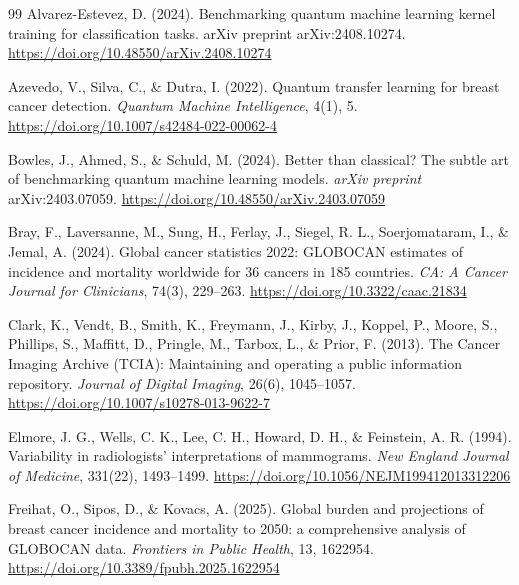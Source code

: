\begin{thebibliography}{99}
    Alvarez-Estevez, D. (2024). Benchmarking quantum machine learning kernel training
    for classification tasks. arXiv preprint arXiv:2408.10274.
    \url{https://doi.org/10.48550/arXiv.2408.10274}


    Azevedo, V., Silva, C., \& Dutra, I. (2022). Quantum transfer learning for breast
    cancer detection. \textit{Quantum Machine Intelligence}, 4(1), 5.
    \url{https://doi.org/10.1007/s42484-022-00062-4}


    Bowles, J., Ahmed, S., \& Schuld, M. (2024).
    Better than classical? The subtle art of benchmarking quantum machine learning models.
    \textit{arXiv preprint} arXiv:2403.07059.
    \url{https://doi.org/10.48550/arXiv.2403.07059}

    Bray, F., Laversanne, M., Sung, H., Ferlay, J., Siegel, R. L., Soerjomataram, I., \& Jemal, A. (2024).
    Global cancer statistics 2022: GLOBOCAN estimates of incidence and mortality worldwide for 36 cancers in 185 countries.
    \textit{CA: A Cancer Journal for Clinicians}, 74(3), 229--263.
    \url{https://doi.org/10.3322/caac.21834}

    Clark, K., Vendt, B., Smith, K., Freymann, J., Kirby, J., Koppel, P., Moore, S., Phillips, S., Maffitt, D., Pringle, M., Tarbox, L., \& Prior, F. (2013).
    The Cancer Imaging Archive (TCIA): Maintaining and operating a public information repository.
    \textit{Journal of Digital Imaging}, 26(6), 1045--1057.
    \url{https://doi.org/10.1007/s10278-013-9622-7}

    Elmore, J. G., Wells, C. K., Lee, C. H., Howard, D. H., \& Feinstein, A. R. (1994).
    Variability in radiologists' interpretations of mammograms.
    \textit{New England Journal of Medicine}, 331(22), 1493--1499.
    \url{https://doi.org/10.1056/NEJM199412013312206}

    Freihat, O., Sipos, D., \& Kovacs, A. (2025). Global burden and projections of
    breast cancer incidence and mortality to 2050: a comprehensive analysis of
    GLOBOCAN data. \textit{Frontiers in Public Health}, 13, 1622954.
    \url{https://doi.org/10.3389/fpubh.2025.1622954}


\end{thebibliography}
